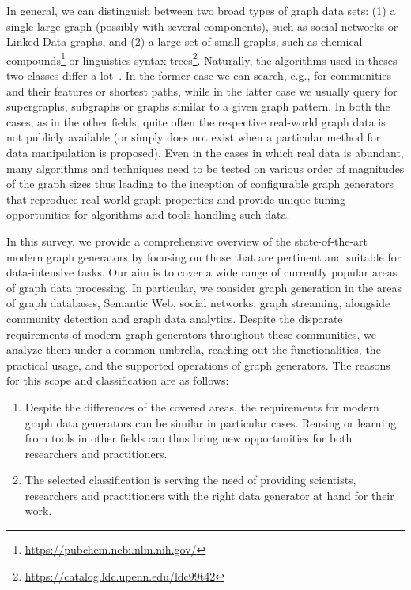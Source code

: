 In general, we can distinguish between two broad types of graph data sets: (1) a single large graph (possibly with several components), such as social networks  or Linked Data graphs, and (2) a large set of small graphs, such as chemical compounds\footnote{\url{https://pubchem.ncbi.nlm.nih.gov/}} or linguistics syntax trees\footnote{\url{https://catalog.ldc.upenn.edu/ldc99t42}}. Naturally, the algorithms used in theses two classes differ a lot~\cite{DBLP:books/igi/Sakr2011}. In the former case we can search, e.g., for communities and their features or shortest paths, while in the latter case we usually query for supergraphs, subgraphs or graphs similar to a given graph pattern. In both the cases, as in the other fields, quite often the respective real-world graph data is not publicly available (or simply does not exist when a particular method for data manipulation is proposed).
Even in the cases in which real data is abundant, many algorithms and techniques need to be tested on various order of magnitudes of the graph sizes thus leading to the inception of
configurable graph generators that reproduce real-world graph properties and provide unique tuning opportunities for
algorithms and tools handling such data.

In this survey, we provide a comprehensive overview of the state-of-the-art
modern
graph generators by focusing on those that are pertinent and suitable for
data-intensive tasks. Our aim is to cover a wide range of currently popular
areas of graph data processing. In particular, we consider graph generation
in the areas of graph databases, Semantic Web, social networks, graph streaming, alongside community detection  and graph data analytics. Despite the disparate requirements of modern graph generators throughout these communities, we analyze them under a common umbrella, reaching out the functionalities, the practical usage, and the supported operations of graph generators. The reasons for this scope and classification are as follows:

\begin{enumerate}
  \item Despite the differences of the covered areas, the requirements for
modern graph data generators can be similar in particular cases. Reusing or learning from tools in other fields can thus bring new opportunities for both researchers and practitioners.
  \item The selected classification is serving the need of providing scientists, researchers and practitioners with the right data generator at hand for their work.
\end{enumerate}

